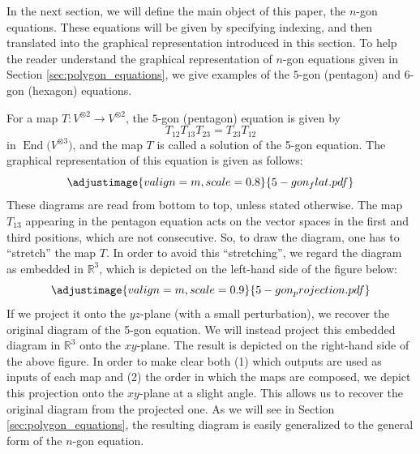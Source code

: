 \documentclass[10pt,a4paper]{amsart}
\numberwithin{equation}{section}
\theoremstyle{definition}
\begin{document}
In the next section, we will define the main object of this paper, the $n$-gon equations.
These equations will be given by specifying indexing, and then translated into the graphical representation introduced in this section.
To help the reader understand the graphical representation of $n$-gon equations given in Section \ref{sec:polygon_equations}, we give examples of the $5$-gon (pentagon) and $6$-gon (hexagon) equations.

For a map $T\colon V^{\otimes 2}\to V^{\otimes 2}$, the $5$-gon (pentagon) equation is given by
\begin{equation*}
T_{12}T_{13}T_{23}=T_{23}T_{12}
\end{equation*}
in $\operatorname{End}\bigl(V^{\otimes 3}\bigr)$, and the map $T$ is called a solution of the 5-gon equation.
The graphical representation of this equation is given as follows:
\begin{equation*}
 \adjustimage{valign=m, scale=0.8}{5-gon_flat.pdf}
\end{equation*}
These diagrams are read from bottom to top, unless stated otherwise.
The map $T_{13}$ appearing in the pentagon equation acts on the vector spaces in the first and third positions, which are not consecutive.
So, to draw the diagram, one has to ``stretch'' the map $T$.
In order to avoid this ``stretching'', we regard the diagram as embedded in $\mathbb{R}^3$, which is depicted on the left-hand side of the figure below:
\begin{equation*}
 \adjustimage{valign=m, scale=0.9}{5-gon_projection.pdf}
\end{equation*}
If we project it onto the $yz$-plane (with a small perturbation), we recover the original diagram of the 5-gon equation.
We will instead project this embedded diagram in $\mathbb{R}^3$ onto the $xy$-plane. The result is depicted on the right-hand side of the above figure.
In order to make clear both (1) which outputs are used as inputs of each map and (2) the order in which the maps are composed, we depict this projection onto the $xy$-plane at a slight angle. This allows us to recover the original diagram from the projected one.
As we will see in Section \ref{sec:polygon_equations}, the resulting diagram is easily generalized to the general form of the $n$-gon equation.
\end{document}
